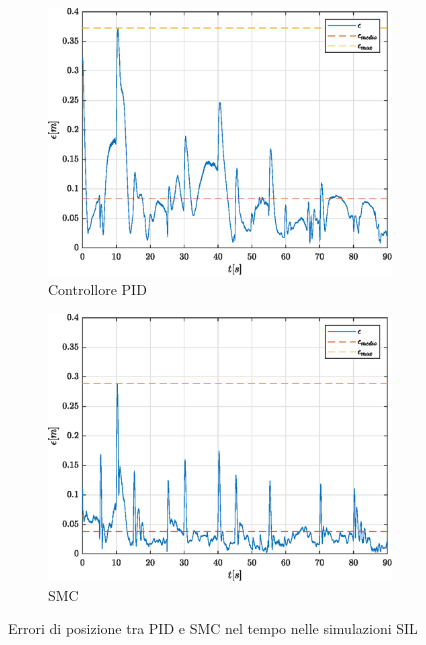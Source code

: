 \begin{figure}
	\centering
	\begin{subfigure}{0.48\textwidth}
		\centering
		\includegraphics[width=1\textwidth]{Simulazioni/Figure/Confronto/ERRPID}
		\caption{Controllore PID}
	\end{subfigure}
	\hfill
	\begin{subfigure}{0.48\textwidth}
		\centering
		\includegraphics[width=1\textwidth]{Simulazioni/Figure/Confronto/ERRSMC}
		\caption{ SMC}
	\end{subfigure}
	\caption{Errori di posizione tra PID e SMC nel tempo nelle simulazioni SIL}
	\label{fig:errori}
\end{figure}

